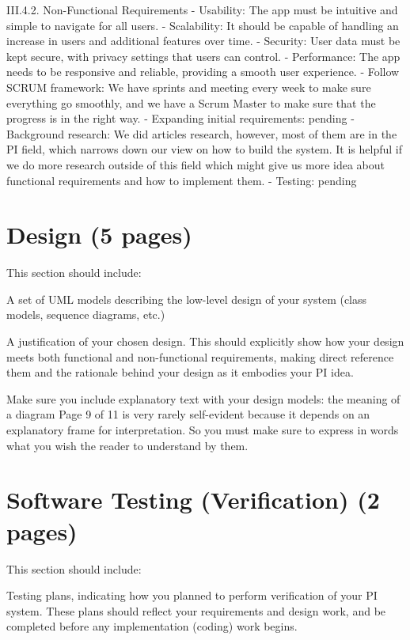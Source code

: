 \documentclass[12pt]{article}
\begin{document}
III.4.2. Non-Functional Requirements
-  		Usability: The app must be intuitive and simple to navigate for all users.
-  		Scalability: It should be capable of handling an increase in users and additional features over time.
-   	Security: User data must be kept secure, with privacy settings that users can control.
- 		Performance: The app needs to be responsive and reliable, providing a smooth user experience.
-  		Follow SCRUM framework: We have sprints and meeting every week to make sure everything go smoothly, and we have a Scrum Master to make sure that the progress is in the right way.
-    	Expanding initial requirements: pending
-  		Background research: We did articles research, however, most of them are in the PI field, which narrows down our view on how to build the system. It is helpful if we do more research outside of this field which might give us more idea about functional requirements and how to implement them.
-    	Testing: pending



\section{Design (5 pages)}

This section should include:

A set of UML models describing the low-level design of your system (class models,
sequence diagrams, etc.)

A justification of your chosen design. This should explicitly show how your design
meets both functional and non-functional requirements, making direct reference
them and the rationale behind your design as it embodies your PI idea.

Make sure you include explanatory text with your design models: the meaning of a diagram
Page 9 of 11
is very rarely self-evident because it depends on an explanatory frame for interpretation. So
you must make sure to express in words what you wish the reader to understand by them.


\section{Software Testing (Verification) (2 pages)}

This section should include:

Testing plans, indicating how you planned to perform verification of your PI system.
These plans should reflect your requirements and design work, and be completed
before any implementation (coding) work begins.
\end{document}
